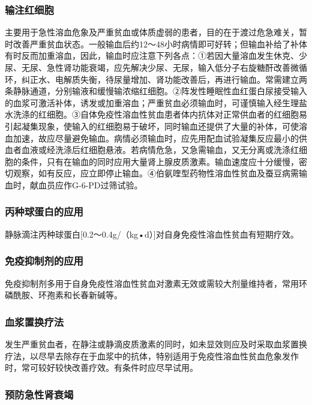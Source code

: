 \subsubsection{输注红细胞}

主要用于急性溶血危象及严重贫血或体质虚弱的患者，目的在于渡过危急难关，暂时改善严重贫血状态。一般输血后约12～48小时病情即可好转；但输血补给了补体有时反而加重溶血，因此，输血时应注意下列各点：①若因大量溶血发生休克、少尿、无尿、急性肾功能衰竭，应先解决少尿、无尿，输入低分子右旋糖酐改善微循环，纠正水、电解质失衡，待尿量增加、肾功能改善后，再进行输血。常需建立两条静脉通道，分别输液和缓慢输浓缩红细胞。②阵发性睡眠性血红蛋白尿接受输入的血浆可激活补体，诱发或加重溶血；严重贫血必须输血时，可谨慎输入经生理盐水洗涤的红细胞。③自体免疫性溶血性贫血患者体内抗体对正常供血者的红细胞易引起凝集现象，使输入的红细胞易于破坏，同时输血还提供了大量的补体，可使溶血加速，故应尽量避免输血。病情必须输血时，应先用配血试验凝集反应最小的供血者血液或经洗涤后红细胞悬液。若病情危急，又急需输血，又无分离或洗涤红细胞的条件，只有在输血的同时应用大量肾上腺皮质激素。输血速度应十分缓慢，密切观察，如有反应，应立即停止输血。④伯氨喹型药物性溶血性贫血及蚕豆病需输血时，献血员应作G-6-PD过筛试验。

\subsubsection{丙种球蛋白的应用}

静脉滴注丙种球蛋白{[}0.2～0.4g/（kg•d）{]}对自身免疫性溶血性贫血有短期疗效。

\subsubsection{免疫抑制剂的应用}

免疫抑制剂多用于自身免疫性溶血性贫血对激素无效或需较大剂量维持者，常用环磷酰胺、环孢素和长春新碱等。

\subsubsection{血浆置换疗法}

发生严重贫血者，在静注或静滴皮质激素的同时，如未显效则应及时采取血浆置换疗法，以尽早去除存在于血浆中的抗体，特别适用于免疫性溶血性贫血危象发作时，常可较好较快改善疗效。有条件时应尽早试用。

\subsubsection{预防急性肾衰竭}

